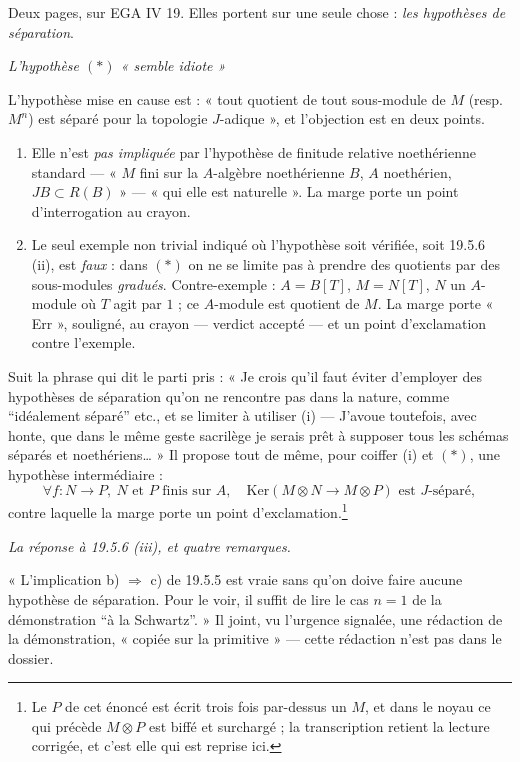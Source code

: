 \documentclass[11pt,a4paper]{article}
\begin{document}
Deux pages, sur EGA IV 19. Elles portent sur une seule chose : \emph{les
hypothèses de séparation}.

\emph{L'hypothèse $(*)$ « semble idiote »}

L'hypothèse mise en cause est : « tout quotient de tout sous-module de $M$
(resp. $M^{n}$) est séparé pour la topologie $J$-adique », et l'objection est
en deux points.

\begin{enumerate}
  \item[(i)] Elle n'est \emph{pas impliquée} par l'hypothèse de finitude
  relative noethérienne standard — « $M$ fini sur la $A$-algèbre noethérienne
  $B$, $A$ noethérien, $JB \subset R(B)$ » — « qui elle est naturelle ». La
  marge porte un point d'interrogation au crayon.
  \item[(ii)] Le seul exemple non trivial indiqué où l'hypothèse soit vérifiée,
  soit 19.5.6 (ii), est \emph{faux} : dans $(*)$ on ne se limite pas à prendre
  des quotients par des sous-modules \emph{gradués}. Contre-exemple : $A =
  B[T]$, $M = N[T]$, $N$ un $A$-module où $T$ agit par $1$ ; ce $A$-module est
  quotient de $M$. La marge porte « Err », souligné, au crayon — verdict
  accepté — et un point d'exclamation contre l'exemple.
\end{enumerate}

Suit la phrase qui dit le parti pris : « Je crois qu'il faut éviter d'employer
des hypothèses de séparation qu'on ne rencontre pas dans la nature, comme
“idéalement séparé” etc., et se limiter à utiliser (i) — J'avoue toutefois, avec
honte, que dans le même geste sacrilège je serais prêt à supposer tous les
schémas séparés et noethériens… » Il propose tout de même, pour coiffer (i) et
$(*)$, une hypothèse intermédiaire :
\[
  \forall f : N \to P ,\ N \text{ et } P \text{ finis sur } A ,\quad
  \mathrm{Ker}(M \otimes N \to M \otimes P) \text{ est } J\text{-séparé} ,
\]
contre laquelle la marge porte un point d'exclamation.\footnote{Le $P$ de cet
énoncé est écrit trois fois par-dessus un $M$, et dans le noyau ce qui précède
$M \otimes P$ est biffé et surchargé ; la transcription retient la lecture
corrigée, et c'est elle qui est reprise ici.}

\emph{La réponse à 19.5.6 (iii), et quatre remarques.}

« L'implication b) $\Rightarrow$ c) de 19.5.5 est vraie sans qu'on doive faire
aucune hypothèse de séparation. Pour le voir, il suffit de lire le cas $n = 1$
de la démonstration “à la Schwartz”. » Il joint, vu l'urgence signalée, une
rédaction de la démonstration, « copiée sur la primitive » — cette rédaction
n'est pas dans le dossier.
\end{document}
